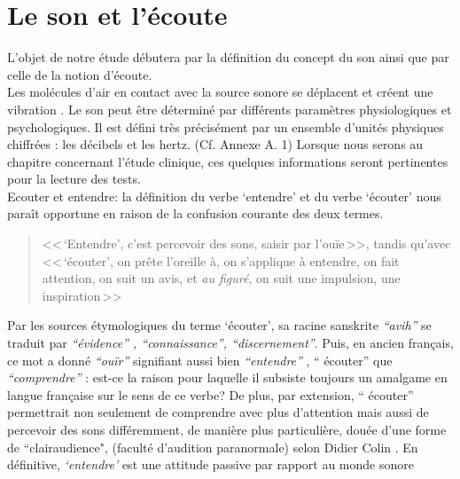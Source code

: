 
\section{Le son et l'écoute}

L'objet de notre étude débutera par la définition du concept du son ainsi que par celle de la notion 
d'écoute.
\\
Les molécules d'air en contact avec la source sonore se déplacent et
créent une vibration \autocite {bencivelli:pourquoi,}.
Le son peut être déterminé par différents paramètres
physiologiques et psychologiques.
Il est défini très précisément par un ensemble d'unités physiques chiffrées
: les décibels  et les hertz. (Cf. Annexe A. 1)
Lorsque nous serons au chapitre concernant l'étude clinique,
ces quelques informations seront pertinentes pour la lecture des tests.
\\
Ecouter et entendre: la définition du verbe `entendre' et du verbe `écouter'
nous paraît opportune
en raison de la confusion courante des deux termes.
\begin{quote}<<\,`Entendre', c'est  percevoir des sons, saisir par l'ouïe\,>>, tandis qu'avec
<<\,`écouter', on prête l'oreille à, on s'applique à entendre, on fait attention, on suit un avis, et \emph{au figuré}, on suit une impulsion, une inspiration\,>> \autocite[361--385]{hachette:dictionnaire} \end{quote}
Par les sources étymologiques du
terme `écouter',
 sa racine sanskrite \emph{ ``avih'' } se traduit par
 \emph{``évidence'' , ``connaissance'', ``discernement''}. Puis, en ancien
 français, ce mot a donné \textit{``ouïr''} signifiant aussi bien \textit{``entendre''} ,
`` écouter'' que \textit{``comprendre''} \autocite {etymologieWeb}:
 est-ce la raison
pour laquelle il subsiste toujours un amalgame en langue française
sur le sens de ce verbe?
De plus, par extension, `` écouter'' permettrait non seulement de comprendre avec plus d'attention
mais aussi de percevoir des sons différemment, de manière plus particulière, douée d'une forme de
``clairaudience", (faculté d'audition paranormale) selon Didier
Colin \autocite {colin2015}.
En définitive, \emph{`entendre'} est une attitude passive par rapport au monde sonore
